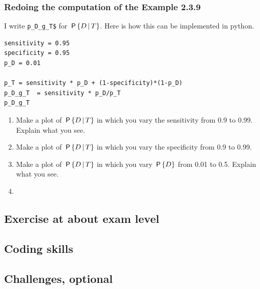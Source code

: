 \documentclass[../../assignments/assignments]{subfiles}
\begin{document}
\subsubsection{Redoing the  computation of the  Example 2.3.9}

I write \texttt{p\_D\_g\_T\$} for \(\P{D\given T}\). Here is how this can be implemented in python.

\begin{verbatim}
sensitivity = 0.95
specificity = 0.95
p_D = 0.01

p_T = sensitivity * p_D + (1-specificity)*(1-p_D)
p_D_g_T  = sensitivity * p_D/p_T
p_D_g_T
\end{verbatim}

\begin{enumerate}
\item Make a plot of \(\P{D\given T}\) in which you vary the sensitivity from 0.9 to 0.99. Explain what you see.
\item Make a plot of \(\P{D\given T}\) in which you vary the specificity from 0.9 to 0.99.
\item Make a plot of \(\P{D\given T}\) in which you vary \(\P{D}\) from 0.01 to 0.5. Explain what you see.
\item
\end{enumerate}



\subsection{Exercise at about exam level}



\subsection{Coding skills}




\subsection{Challenges, optional}
\end{document}
